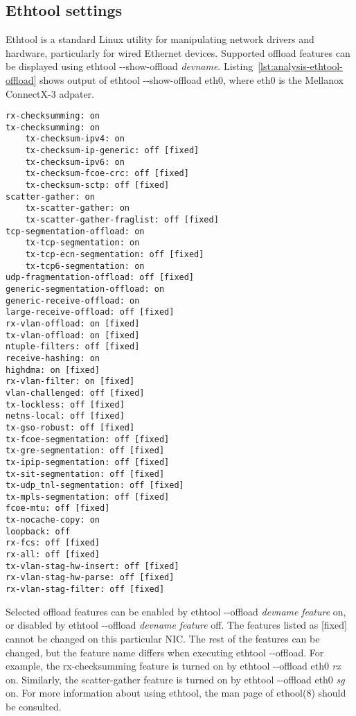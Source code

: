 
\subsection{Ethtool settings}\label{subsec:analysis-settings-ethtool}
Ethtool is a standard Linux utility for manipulating network drivers and hardware, particularly for
wired Ethernet devices.
Supported offload features can be displayed using ethtool -{}-show-offload {\it{devname}}.
Listing~\ref{lst:analysis-ethtool-offload} shows output of ethtool -{}-show-offload eth0,
where eth0 is the Mellanox ConnectX-3 adpater.

\begin{lstlisting}[caption={Output of ethtool -{}-show-offload for Mellanox ConnectX3 adapter},label={lst:analysis-ethtool-offload}]
rx-checksumming: on
tx-checksumming: on
	tx-checksum-ipv4: on
	tx-checksum-ip-generic: off [fixed]
	tx-checksum-ipv6: on
	tx-checksum-fcoe-crc: off [fixed]
	tx-checksum-sctp: off [fixed]
scatter-gather: on
	tx-scatter-gather: on
	tx-scatter-gather-fraglist: off [fixed]
tcp-segmentation-offload: on
	tx-tcp-segmentation: on
	tx-tcp-ecn-segmentation: off [fixed]
	tx-tcp6-segmentation: on
udp-fragmentation-offload: off [fixed]
generic-segmentation-offload: on
generic-receive-offload: on
large-receive-offload: off [fixed]
rx-vlan-offload: on [fixed]
tx-vlan-offload: on [fixed]
ntuple-filters: off [fixed]
receive-hashing: on
highdma: on [fixed]
rx-vlan-filter: on [fixed]
vlan-challenged: off [fixed]
tx-lockless: off [fixed]
netns-local: off [fixed]
tx-gso-robust: off [fixed]
tx-fcoe-segmentation: off [fixed]
tx-gre-segmentation: off [fixed]
tx-ipip-segmentation: off [fixed]
tx-sit-segmentation: off [fixed]
tx-udp_tnl-segmentation: off [fixed]
tx-mpls-segmentation: off [fixed]
fcoe-mtu: off [fixed]
tx-nocache-copy: on
loopback: off
rx-fcs: off [fixed]
rx-all: off [fixed]
tx-vlan-stag-hw-insert: off [fixed]
rx-vlan-stag-hw-parse: off [fixed]
rx-vlan-stag-filter: off [fixed]
\end{lstlisting}

Selected offload features can be enabled by ethtool -{}-offload {\it{devname}} {\it{feature}} on,
or disabled by ethtool -{}-offload {\it{devname}} {\it{feature}} off.
The features listed as [fixed] cannot be changed on this particular NIC.
The rest of the features can be changed, but the feature name differs when executing ethtool -{}-offload.
For example, the rx-checksumming feature is turned on by ethtool -{}-offload eth0 {\it{rx}} on.
Similarly, the scatter-gather feature is turned on by ethtool -{}-offload eth0 {\it{sg}} on.
For more information about using ethtool, the man page of ethool(8) should be consulted.

